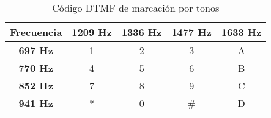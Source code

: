 \begin{table}[htb]
	\begin{center}
		\begin{tabular}{c|c|c|c|c}
			\textbf{Frecuencia} & \textbf{1209 Hz} & \textbf{1336 Hz} & \textbf{1477 Hz} & \textbf{1633 Hz} \\
			\hline
			\textbf{697 Hz} & 1 & 2 & 3 & A \\
			\hline
			\textbf{770 Hz} & 4 & 5 & 6 & B \\
			\hline
			\textbf{852 Hz} & 7 & 8 & 9 & C \\
			\hline
			\textbf{941 Hz} & * & 0 & \# & D \\
		\end{tabular}
	\end{center}
	\caption{Código DTMF de marcación por tonos}
	\label{tabla:DTMF}
\end{table}
